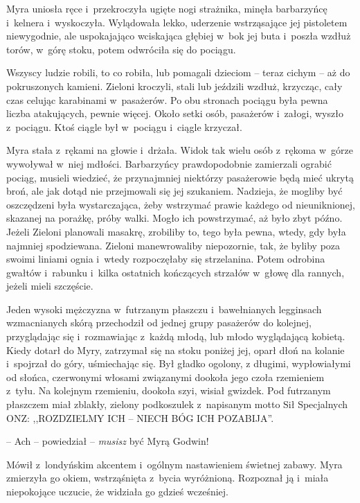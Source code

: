 \documentclass[oneside,polish,11pt,sfheadings]{mwbk}
\begin{document}
Myra uniosła ręce i~przekroczyła ugięte nogi strażnika, minęła
barbarzyńcę i~kelnera i~wyskoczyła. Wylądowała lekko, uderzenie
wstrząsające jej pistoletem niewygodnie, ale uspokajająco wciskająca
głębiej w~bok jej buta i~poszła wzdłuż torów, w~górę stoku, potem
odwróciła się do pociągu.

Wszyscy ludzie robili, to co robiła, lub pomagali dzieciom -- teraz
cichym -- aż do pokruszonych kamieni. Zieloni kroczyli, stali lub
jeździli wzdłuż, krzycząc, cały czas celując karabinami w~pasażerów. Po
obu stronach pociągu była pewna liczba atakujących, pewnie więcej. Około
setki osób, pasażerów i~załogi, wyszło z~pociągu. Ktoś ciągle był w~pociągu i~ciągle krzyczał.

Myra stała z~rękami na głowie i~drżała. Widok tak wielu osób z~rękoma w~górze wywoływał w~niej mdłości. Barbarzyńcy prawdopodobnie zamierzali
ograbić pociąg, musieli wiedzieć, że przynajmniej niektórzy pasażerowie
będą mieć ukrytą broń, ale jak dotąd nie przejmowali się jej szukaniem.
Nadzieja, że mogliby być oszczędzeni była wystarczająca, żeby wstrzymać
prawie każdego od nieuniknionej, skazanej na porażkę, próby walki. Mogło
ich powstrzymać, aż było zbyt późno. Jeżeli Zieloni planowali masakrę,
zrobiliby to, tego była pewna, wtedy, gdy była najmniej spodziewana.
Zieloni manewrowaliby niepozornie, tak, że byliby poza swoimi liniami
ognia i~wtedy rozpoczęłaby się strzelanina. Potem odrobina gwałtów i~rabunku i~kilka ostatnich kończących strzałów w~głowę dla rannych,
jeżeli mieli szczęście.

Jeden wysoki mężczyzna w~futrzanym płaszczu i~bawełnianych legginsach
wzmacnianych skórą przechodził od jednej grupy pasażerów do kolejnej,
przyglądając się i~rozmawiając z~każdą młodą, lub młodo wyglądającą
kobietą. Kiedy dotarł do Myry, zatrzymał się na stoku poniżej jej, oparł
dłoń na kolanie i~spojrzał do góry, uśmiechając się. Był gładko ogolony,
z długimi, wypłowiałymi od słońca, czerwonymi włosami związanymi dookoła
jego czoła rzemieniem z~tyłu. Na kolejnym rzemieniu, dookoła szyi,
wisiał gwizdek. Pod futrzanym płaszczem miał zblakły, zielony
podkoszulek z~napisanym motto Sił Specjalnych ONZ: ,,ROZDZIELMY ICH -- NIECH BÓG ICH POZABIJA''.

-- Ach -- powiedział -- \textit{musisz} być Myrą Godwin!

Mówił z~londyńskim akcentem i~ogólnym nastawieniem świetnej zabawy. Myra
zmierzyła go okiem, wstrząśnięta z~bycia wyróżnioną. Rozpoznał ją i~miała niepokojące uczucie, że widziała go gdzieś wcześniej.
\end{document}
